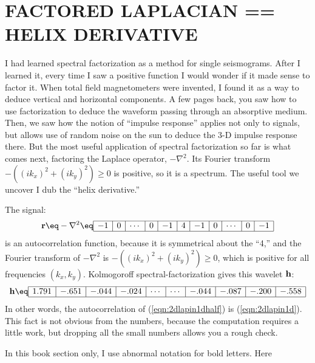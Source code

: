 \section{FACTORED LAPLACIAN == HELIX DERIVATIVE}
I had learned spectral factorization as a method for single seismograms.
After I learned it,
every time I saw a positive function
I would wonder if it made sense to factor it.
When total field
magnetometers were invented,
I found it as a way to deduce vertical and horizontal
components.
A few pages back, you saw how to use factorization
to deduce the waveform passing through an absorptive medium.
Then, we saw how the notion of ``impulse response''
applies not only to signals,
but allows use of random noise on the sun
to deduce the 3-D impulse response there.
But the most useful application of spectral factorization so far
is what comes next, factoring the Laplace operator, $-\nabla^2$.
Its Fourier transform $-((ik_x)^2+(ik_y)^2) \ge 0$ is positive, so it is a spectrum.
The useful tool we uncover I dub the ``helix derivative.''
\par
The signal:
\begin{equation}
\label{eqn:2dlapin1d}
\bold r \eq
-\nabla^2
\eq
\begin{array}{|r|r|r|r|r|r|r|r|r|r|r|r|r|r|r|} \hline
-1&0&\cdots&0&-1&4&-1&0& \cdots&0&-1
\\ \hline
\end{array}
\end{equation}
is an autocorrelation function, because
it is symmetrical about the ``4,''
and the Fourier transform of $-\nabla^2$ is $-((ik_x)^2+(ik_y)^2) \ge 0$,
which is positive for all frequencies $(k_x,k_y)$.
Kolmogoroff spectral-factorization gives this wavelet $\bold h $:
\begin{equation}
\label{eqn:2dlapin1dhalf}
{\bold h}
\eq
\begin{array}{|r|r|r|r|r|r|r|r|r|r|r|r|r|r|r|}
\hline
1.791&-.651&-.044&-.024&\cdots&\cdots&-.044&-.087&-.200&-.558 \\
\hline
\end{array}
\label{eqn:lapfacrow}
\end{equation}
In other words,
the autocorrelation of
(\ref{eqn:2dlapin1dhalf}) is
(\ref{eqn:2dlapin1d}).
This fact is not obvious from the numbers,
because the computation requires a little work,
but dropping all the small numbers
allows you a rough check.
\par
In this book section only, 
I use abnormal notation for bold letters.
Here
